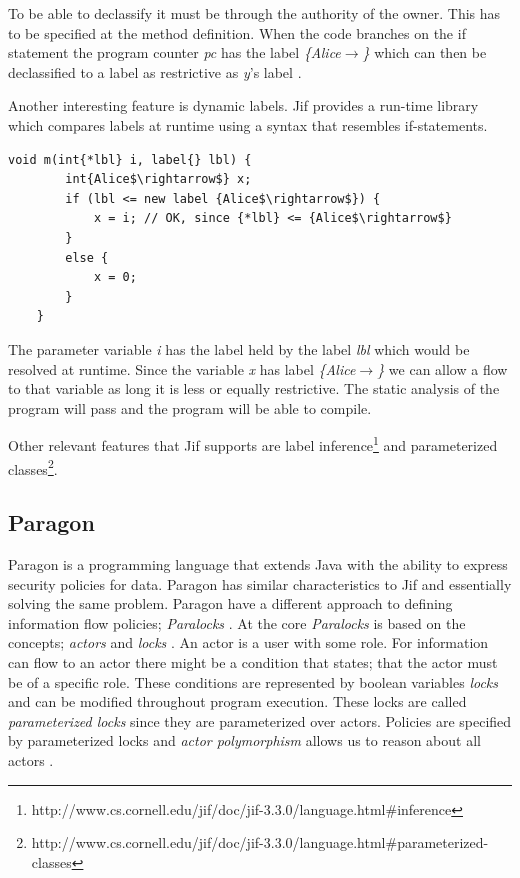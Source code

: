 To be able to declassify it must be through the authority of the owner. This has to be specified at the method definition. When the code branches on the if statement the program counter \emph{pc} has the label \emph{\{Alice$\rightarrow$\}} which can then be declassified to a label as restrictive as \emph{y}'s label \cite{jifmanual} \cite{Srikant}.

Another interesting feature is dynamic labels. Jif provides a run-time library which compares labels at runtime using a syntax that resembles if-statements.
\begin{lstlisting}[mathescape]
	void m(int{*lbl} i, label{} lbl) {
		int{Alice$\rightarrow$} x;
		if (lbl <= new label {Alice$\rightarrow$}) {
			x = i; // OK, since {*lbl} <= {Alice$\rightarrow$}
		}
		else {
			x = 0;
		}
	}
\end{lstlisting}

The parameter variable \emph{i} has the label held by the label \emph{lbl} which would be resolved at runtime. Since the variable \emph{x} has label \emph{\{Alice$\rightarrow$\}} we can allow a flow to that variable as long it is less or equally restrictive. The static analysis of the program will pass and the program will be able to compile.  


Other relevant features that Jif supports are label inference\footnote{http://www.cs.cornell.edu/jif/doc/jif-3.3.0/language.html\#inference} and parameterized classes\footnote{http://www.cs.cornell.edu/jif/doc/jif-3.3.0/language.html\#parameterized-classes}.
\subsection{Paragon}

Paragon is a programming language that extends Java with the ability to express security policies for data. Paragon has similar characteristics to Jif and essentially solving the same problem. Paragon have a different approach to defining information flow policies; \emph{Paralocks} \cite{paralocks} \cite{paragonpaper}.
At the core \emph{Paralocks} is based on the concepts; \emph{actors} and \emph{locks} \cite{paralocks}. An actor is a user with some role. For information can flow to an actor there might be a condition that states; that the actor must be of a specific role. These conditions are represented by boolean variables \emph{locks} and can be modified throughout program execution. These locks are called \emph{parameterized locks} since they are parameterized over actors. Policies are specified by parameterized locks and \emph{actor polymorphism} allows us to reason about all actors \cite{paragonpaper}.


